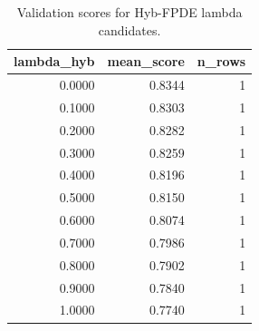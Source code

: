 \begin{table}[t]
\caption{Validation scores for Hyb-FPDE lambda candidates.}
\label{tab:lambda_distribution_computed}
\centering
\begin{tabular}{rrr}
\toprule
lambda\_hyb & mean\_score & n\_rows \\
\midrule
0.0000 & 0.8344 & 1 \\
0.1000 & 0.8303 & 1 \\
0.2000 & 0.8282 & 1 \\
0.3000 & 0.8259 & 1 \\
0.4000 & 0.8196 & 1 \\
0.5000 & 0.8150 & 1 \\
0.6000 & 0.8074 & 1 \\
0.7000 & 0.7986 & 1 \\
0.8000 & 0.7902 & 1 \\
0.9000 & 0.7840 & 1 \\
1.0000 & 0.7740 & 1 \\
\bottomrule
\end{tabular}

\end{table}
